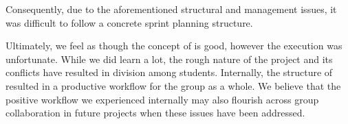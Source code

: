 Consequently, due to the aforementioned structural and management issues, it was difficult to follow a concrete sprint planning structure.


Ultimately, we feel as though the concept of \knox{} is good, however the execution was unfortunate. 
While we did learn a lot, the rough nature of the project and its conflicts have resulted in division among students. 
Internally, the structure of \knox{} resulted in a productive workflow for the group as a whole. 
We believe that the positive workflow we experienced internally may also flourish across group collaboration in future projects when these issues have been addressed.